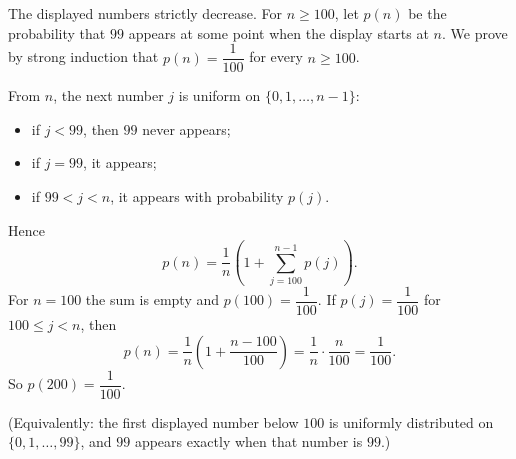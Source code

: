 The displayed numbers strictly decrease. For $n\ge100$, let $p(n)$ be the probability that $99$ appears at some point when the display starts at $n$. We prove by strong induction that $p(n)=\dfrac{1}{100}$ for every $n\ge100$.

From $n$, the next number $j$ is uniform on $\{0,1,\dots,n-1\}$:
\begin{itemize}
\item if $j<99$, then $99$ never appears;
\item if $j=99$, it appears;
\item if $99<j<n$, it appears with probability $p(j)$.
\end{itemize}
Hence
\[p(n)=\dfrac1n\left(1+\sum_{j=100}^{n-1}p(j)\right).\]
For $n=100$ the sum is empty and $p(100)=\dfrac1{100}$. If $p(j)=\dfrac1{100}$ for $100\le j<n$, then
\[p(n)=\dfrac1n\left(1+\dfrac{n-100}{100}\right)=\dfrac1n\cdot\dfrac{n}{100}=\dfrac{1}{100}.\]
So $p(200)=\boxed{\dfrac{1}{100}}$.

(Equivalently: the first displayed number below $100$ is uniformly distributed on $\{0,1,\dots,99\}$, and $99$ appears exactly when that number is $99$.)

